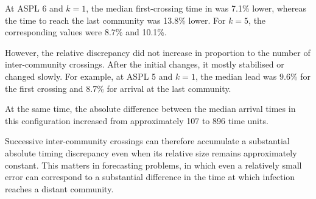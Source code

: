 At ASPL 6 and $k=1$, the median first-crossing time in \TS{} was 7.1\% lower, whereas the time to reach the last community was 13.8\% lower. For $k=5$, the corresponding values were 8.7\% and 10.1\%.

However, the relative discrepancy did not increase in proportion to the number of inter-community crossings. After the initial changes, it mostly stabilised or changed slowly. For example, at ASPL 5 and $k=1$, the median lead was 9.6\% for the first crossing and 8.7\% for arrival at the last community.

At the same time, the absolute difference between the median arrival times in this configuration increased from approximately 107 to 896 time units.

Successive inter-community crossings can therefore accumulate a substantial absolute timing discrepancy even when its relative size remains approximately constant. This matters in forecasting problems, in which even a relatively small error can correspond to a substantial difference in the time at which infection reaches a distant community.

